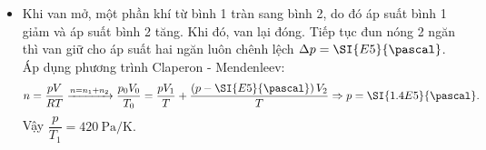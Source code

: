 \begin{ex}
{\begin{itemize}
\begin{center}
\begin{tabular}{C{4cm} C{3cm} C{4cm}}
					$p_0=\SI{0.9E5}{\pascal}$ & &$p_1=\SI{E5}{\pascal}$\\
					$T_0=\SI{300}{\kelvin}$ & & $T_1=?$
				\end{tabular}
			\end{center}
			$$\dfrac{p_0}{T_0}=\dfrac{p_1}{T_1}\Rightarrow T_1=\xsi{\dfrac{1000}{3}}{\kelvin}.$$
			\item Khi van mở, một phần khí từ bình 1 tràn sang bình 2, do đó áp suất bình 1 giảm và áp suất bình 2 tăng. Khi đó, van lại đóng. Tiếp tục đun nóng 2 ngăn thì van giữ cho áp suất hai ngăn luôn chênh lệch $\Delta p=\SI{E5}{\pascal}$.\\
			Áp dụng phương trình Claperon - Mendenleev:
			$$ n=\dfrac{pV}{RT}\xrightarrow{ n= n_1+ n_2}\dfrac{p_0V_0}{T_0}=\dfrac{pV_1}{T}+\dfrac{\left(p-\SI{E5}{\pascal}\right)V_2}{T}\Rightarrow p=\SI{1.4E5}{\pascal}.$$
			Vậy $\dfrac{p}{T_1}=\SI{420}{\pascal/\kelvin}.$
	\end{itemize}}
\end{ex}
